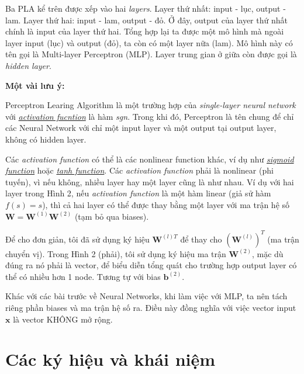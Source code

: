 {Ba PLA kể trên được xếp vào hai \textit{layers}. Layer thứ nhất: input - lục, output - lam. Layer thứ hai: input - lam, output - đỏ. Ở đây, output của layer thứ nhất chính là input của layer thứ hai. Tổng hợp lại ta được một mô hình mà ngoài layer input (lục) và output (đỏ), ta còn có một layer nữa (lam). Mô hình này có tên gọi là Multi-layer Perceptron (MLP). Layer trung gian ở giữa còn được gọi là \textit{hidden layer}. 
 
 
\textbf{Một vài lưu ý:} 
 
\item Perceptron Learing Algorithm là một trường hợp của \textit{single-layer neural network} với \href{http://machinelearningcoban.com/2017/01/27/logisticregression/#nhac-lai-hai-mo-hinh-tuyen-tinh}{\textit{activation fucntion}} là hàm \textit{sgn}. Trong khi đó, Perceptron là tên chung để chỉ các Neural Network với chỉ một input layer và một output tại output layer, không có hidden layer. 
 
\item Các \textit{activation function} có thể là các nonlinear function khác, ví dụ như \href{http://machinelearningcoban.com/2017/01/27/logisticregression/#sigmoid-function}{\textit{sigmoid function}} hoặc \href{http://machinelearningcoban.com/2017/01/27/logisticregression/#tanh-function}{\textit{tanh function}}. Các \textit{activation function} phải là nonlinear (phi tuyến), vì nếu không, nhiều layer hay một layer cũng là như nhau. Ví dụ với hai layer trong Hình 2, nếu \textit{activation function} là một hàm linear (giả sử hàm $f(s) = s$), thì cả hai layer có thể được thay bằng một layer với ma trận hệ số $\mathbf{W} = \mathbf{W}^{(1)}\mathbf{W}^{(2)}$ (tạm bỏ qua biases). 
 
\item Để cho đơn giản, tôi đã sử dụng ký hiệu $\mathbf{W}^{(l)T}$ để thay cho $(\mathbf{W}^{(l)})^T$ (ma trận chuyển vị). Trong Hình 2 (phải), tôi sử dụng ký hiệu ma trận $\mathbf{W}^{(2)}$, mặc dù đúng ra nó phải là vector, để biểu diễn tổng quát cho trường hợp output layer có thể có nhiều hơn 1 node. Tương tự với bias $\mathbf{b}^{(2)}$. 
 
\item Khác với các bài trước về Neural Networks, khi làm việc với MLP, ta nên tách riêng phần biases và ma trận hệ số ra. Điều này đồng nghĩa với việc vector input $\mathbf{x}$ là vector KHÔNG mở rộng. 
 
 
\section{Các ký hiệu và khái niệm}
 
}
